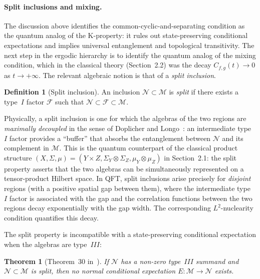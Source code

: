 \documentclass[a4paper,11pt]{article}
\newtheorem{theorem}{Theorem}
\theoremstyle{definition}
\newtheorem{definition}{Definition}[section]
\begin{document}
\paragraph{Split inclusions and mixing.}

The discussion above identifies the common-cyclic-and-separating condition as the
quantum analog of the K-property: it rules out state-preserving conditional expectations
and implies universal entanglement and topological transitivity.  The next step in the
ergodic hierarchy is to identify the quantum analog of the mixing condition, which in the
classical theory (Section~2.2) was the decay $C_{f,g}(t)\to 0$ as $t\to+\infty$.
The relevant algebraic notion is that of a \emph{split inclusion}.

\begin{definition}[Split inclusion]\label{def:split}
An inclusion $\mathcal{N}\subset\mathcal{M}$ is \emph{split} if there exists a type~$I$
factor $\mathcal{F}$ such that $\mathcal{N}\subset\mathcal{F}\subset\mathcal{M}$.
\end{definition}

\noindent Physically, a split inclusion is one for which the algebras of the two regions are
\emph{maximally decoupled} in the sense of Doplicher and Longo~\cite{DopLongo1984}:
an intermediate type~$I$ factor provides a ``buffer'' that absorbs the entanglement between
$\mathcal{N}$ and its complement in $\mathcal{M}$.  This is the quantum counterpart of
the classical product structure $(X,\Sigma,\mu)=(Y\times Z,\Sigma_Y\otimes\Sigma_Z,\mu_Y\otimes\mu_Z)$
in Section~2.1: the split property asserts that the two algebras can be simultaneously
represented on a tensor-product Hilbert space.  In QFT, split inclusions arise precisely
for \emph{disjoint} regions (with a positive spatial gap between them), where the
intermediate type~$I$ factor is associated with the gap and the correlation functions
between the two regions decay exponentially with the gap width.  The corresponding
$L^2$-nuclearity condition quantifies this decay.

The split property is incompatible with a state-preserving conditional expectation when
the algebras are type~$III$:

\begin{theorem}[{Theorem~30 in~\cite{ChLaLe2026}}]\label{thm:split-no-CE}
If $\mathcal{N}$ has a non-zero type~$III$ summand and $\mathcal{N}\subset\mathcal{M}$
is split, then no normal conditional expectation $E:\mathcal{M}\to\mathcal{N}$ exists.
\end{theorem}
\end{document}
